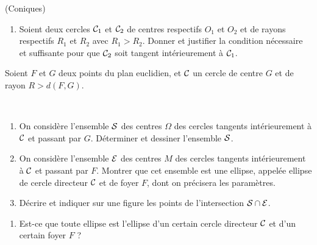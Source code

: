 \documentclass[a4paper,12pt,reqno]{amsart}
\begin{document}
\sisujet{\bigskip}
\begin{exo} (Coniques)

  \begin{enumerate}
    \item Soient deux cercles $\mathcal{C}_{1}$ et $\mathcal{C}_{2}$ de centres respectifs $O_{1}$ et $O_{2}$ et de rayons respectifs $R_{1}$ et $R_{2}$ avec $R_{1} > R_{2}$. Donner et justifier la condition nécessaire et suffisante pour que $\mathcal{C}_{2}$ soit tangent intérieurement à $\mathcal{C}_{1}$.
  \end{enumerate}

  Soient $F$ et $G$ deux points du plan euclidien, et $\mathcal{C}$ un cercle de centre $G$ et de rayon $R > d(F,G)$.

  ~
  \vspace{-14mm}

  \begin{enumerate}[resume]
    \item On considère l'ensemble $\mathcal{S}$ des centres $\Omega$ des cercles tangents intérieurement à $\mathcal{C}$ et passant par $G$. Déterminer et dessiner l'ensemble $\mathcal{S}$.
    \item On considère l'ensemble $\mathcal{E}$ des centres $M$ des cercles tangents intérieurement à $\mathcal{C}$ et passant par $F$. Montrer que cet ensemble est une ellipse, appelée ellipse de cercle directeur $\mathcal{C}$ et de foyer $F$, dont on précisera les paramètres.
    \item Décrire et indiquer sur une figure les points de l'intersection $\mathcal{S}\cap\mathcal{E}$.
  \end{enumerate}
  \vspace{-4mm}

  \begin{enumerate}[resume]
    \item Est-ce que toute ellipse est l'ellipse d'un certain cercle directeur $\mathcal{C}$ et d'un certain foyer $F$ ?
  \end{enumerate}

\end{exo}
\end{document}
